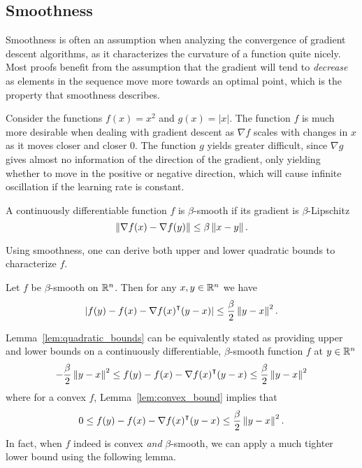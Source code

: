 \subsection{Smoothness}

Smoothness is often an assumption when analyzing the convergence of gradient
descent algorithms, as it characterizes the curvature of a function quite
nicely. Most proofs benefit from the assumption that the gradient will tend to
\emph{decrease} as elements in the sequence move more towards an optimal point,
which is the property that smoothness describes.

\begin{example}
    Consider the functions $f(x) = x^2$ and $g(x) = |x|$. The function $f$ is
    much more desirable when dealing with gradient descent as $\nabla f$ scales
    with changes in $x$ as it moves closer and closer 0. The
    function $g$ yields greater difficult, since $\nabla g$ gives almost no
    information of the direction of the gradient, only yielding whether to move
    in the positive or negative direction, which will cause infinite oscillation
    if the learning rate is constant.
\end{example}


\begin{definition}
    A continuously differentiable function $f$ is $\beta$-smooth if its gradient
    is $\beta$-Lipschitz
    \begin{equation}
        \left\| \nabla f(x) - \nabla f(y) \right\| \leq \beta \left\| x - y \right\|.
    \end{equation}
\end{definition}

Using smoothness, one can derive both upper and lower quadratic bounds to
characterize $f$. 

\begin{lemma}
    \label{lem:quadratic_bounds}
    Let $f$ be $\beta$-smooth on $\mathbb R^n$. Then for any $x, y \in \mathbb R^n$ we have 
    \begin{equation}
        \left| f(y) - f(x) - \nabla {f(x)}^\intercal(y - x) \right| \leq \frac{\beta}{2}
        \left\| y - x \right\|^2.
    \end{equation}
\end{lemma}

Lemma~\ref{lem:quadratic_bounds} can be equivalently stated as providing upper
and lower bounds on a continuously differentiable, $\beta$-smooth function $f$
at $y \in \mathbb R^n$
\begin{equation}
    - \frac{\beta}{2} \left\| y - x \right\|^2 \leq
    f(y) - f(x) - \nabla {f(x)}^\intercal(y - x)\leq
     \frac{\beta}{2} \left\| y - x \right\|^2
\end{equation}
where for a convex $f$, Lemma~\ref{lem:convex_bound} implies that
\begin{equation}
    \label{eq:lem4_1}
    0 \leq f(y) - f(x) - \nabla {f(x)}^\intercal (y - x) \leq
    \frac{\beta}{2} \left\| y - x \right\|^2.
\end{equation}
In fact, when $f$ indeed is convex \emph{and} $\beta$-smooth, we can apply a
much tighter lower bound using the following lemma.

